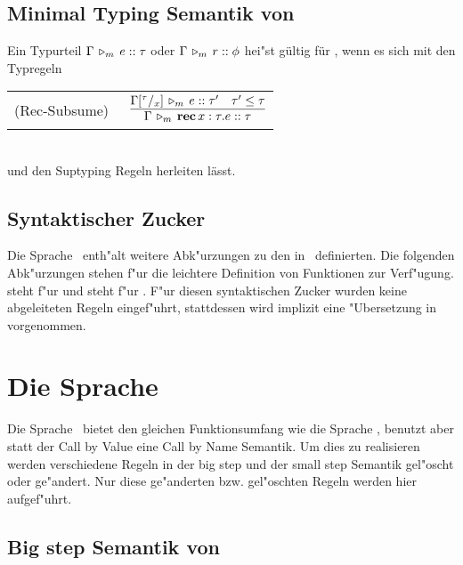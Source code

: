 \subsection{Minimal Typing Semantik von \LTWO}

  Ein Typurteil $\Gamma\,\triangleright_m\,e\mathrel{::}\tau$ oder $\Gamma\,\triangleright_m\,r\mathrel{::}\phi$ hei"st g\"ultig f\"ur \Lom,
  wenn es sich mit den Typregeln \\[5mm]
  \begin{tabular}{ll} 
    \mbox{(Rec-Subsume)\ }  & $\RULE{\Tjm{\Gamma\SUB{\tau}{x}}{e}{\tau'} \quad \tau' \le \tau}
                              {\Tjm{\Gamma}{\expRec{x:\tau}{e}}{\tau}}$ \\[4mm]
  \end{tabular} \\[7mm]
  und den Suptyping Regeln herleiten l\"asst.


\subsection{Syntaktischer Zucker}

Die Sprache \LTWO\ enth"alt weitere Abk"urzungen zu den in \LONE\ definierten. Die folgenden Abk"urzungen stehen f"ur
die leichtere Definition von Funktionen zur Verf"ugung.
\beqns
\eeqns
steht f"ur
\beqns
\eeqns
und
\beqns
\eeqns
steht f"ur
\beqns
  \mbox{.}
\eeqns
F"ur diesen syntaktischen Zucker wurden keine abgeleiteten Regeln eingef"uhrt, stattdessen wird implizit
eine "Ubersetzung in  vorgenommen.



\section{Die Sprache \LTWOCBN}

Die Sprache \LTWOCBN \ bietet den gleichen Funktionsumfang wie die Sprache \LTWO, benutzt aber statt der 
Call by Value eine Call by Name Semantik. Um dies zu realisieren werden verschiedene Regeln in der big step 
und der small step Semantik gel"oscht oder ge"andert. Nur diese ge"anderten bzw. gel"oschten Regeln werden hier
aufgef"uhrt.

\subsection{Big step Semantik von \LTWOCBN}

